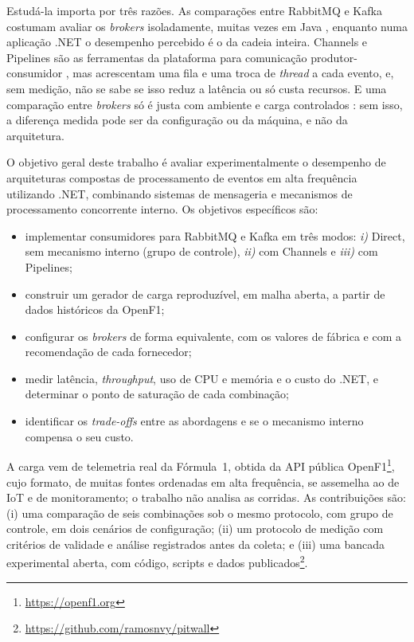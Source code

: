 \documentclass[12pt]{article}
\begin{document}
Estudá-la importa por três razões. As comparações entre RabbitMQ e Kafka costumam avaliar
os \textit{brokers} isoladamente, muitas vezes em Java \cite{dobbelaere:2017,kaminski:2025},
enquanto numa aplicação .NET o desempenho percebido é o da cadeia inteira. Channels e
Pipelines são as ferramentas da plataforma para comunicação produtor-consumidor
\cite{microsoft:channels,microsoft:pipelines}, mas acrescentam uma fila e uma troca de
\textit{thread} a cada evento, e, sem medição, não se sabe se isso reduz a latência ou só custa
recursos. E uma comparação entre \textit{brokers} só é justa com ambiente e carga controlados
\cite{fu:2021}: sem isso, a diferença medida pode ser da configuração ou da máquina, e não
da arquitetura.

O objetivo geral deste trabalho é avaliar experimentalmente o desempenho de arquiteturas
compostas de processamento de eventos em alta frequência utilizando .NET, combinando
sistemas de mensageria e mecanismos de processamento concorrente interno. Os objetivos
específicos são:

\begin{itemize}
  \item implementar consumidores para RabbitMQ e Kafka em três modos: \textit{i)} Direct, sem
        mecanismo interno (grupo de controle), \textit{ii)} com Channels e \textit{iii)} com Pipelines;
  \item construir um gerador de carga reproduzível, em malha aberta, a partir de dados
        históricos da OpenF1;
  \item configurar os \textit{brokers} de forma equivalente, com os valores de fábrica e com a
        recomendação de cada fornecedor;
  \item medir latência, \textit{throughput}, uso de CPU e memória e o custo do .NET, e determinar
        o ponto de saturação de cada combinação;
  \item identificar os \textit{trade-offs} entre as abordagens e se o mecanismo interno compensa
        o seu custo.
\end{itemize}

A carga vem de telemetria real da Fórmula~1, obtida da API pública
OpenF1\footnote{\url{https://openf1.org}}, cujo formato, de muitas fontes ordenadas em alta
frequência, se assemelha ao de IoT e de monitoramento; o trabalho não analisa as corridas.
As contribuições são: (i) uma comparação de seis combinações sob o mesmo protocolo, com
grupo de controle, em dois cenários de configuração; (ii) um protocolo de medição com
critérios de validade e análise registrados antes da coleta; e (iii) uma bancada
experimental aberta, com código, scripts e dados
publicados\footnote{\url{https://github.com/ramosnvy/pitwall}}.
\end{document}
